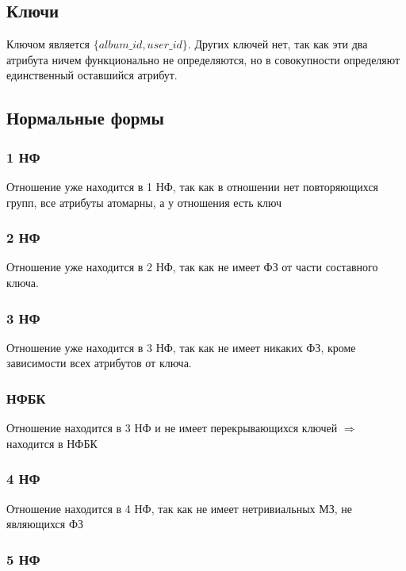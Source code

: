 \documentclass{article}
\begin{document}
\subsection{Ключи}

Ключом является $\{album\_id, user\_id\}$. Других ключей нет, так как эти два атрибута ничем функционально не определяются, но в совокупности определяют единственный оставшийся атрибут.

\subsection{Нормальные формы}

\subsubsection{1 НФ}

Отношение уже находится в 1 НФ, так как в отношении нет повторяющихся групп, все атрибуты атомарны, а у отношения есть ключ

\subsubsection{2 НФ}

Отношение уже находится в 2 НФ, так как не имеет ФЗ от части составного ключа.

\subsubsection{3 НФ}

Отношение уже находится в 3 НФ, так как не имеет никаких ФЗ, кроме зависимости всех атрибутов от ключа.

\subsubsection{НФБК}

Отношение находится в 3 НФ и не имеет перекрывающихся ключей $\Rightarrow$ находится в НФБК

\subsubsection{4 НФ}

Отношение находится в 4 НФ, так как не имеет нетривиальных МЗ, не являющихся ФЗ

\subsubsection{5 НФ}
\end{document}
